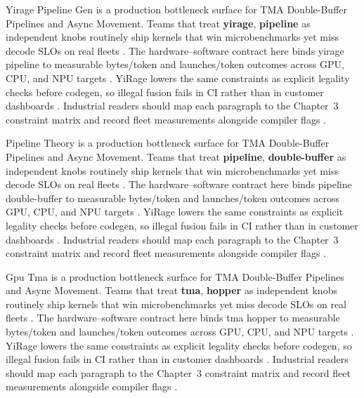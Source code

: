 Yirage Pipeline Gen is a production bottleneck surface for TMA Double-Buffer Pipelines and Async Movement. Teams that treat \textbf{yirage}, \textbf{pipeline} as independent knobs routinely ship kernels that win microbenchmarks yet miss decode SLOs on real fleets \citep{semianalysis2024tma,dlbook}. The hardware--software contract here binds yirage pipeline to measurable bytes/token and launches/token outcomes across GPU, CPU, and NPU targets \citep{amd2024xdna,dao2022flashattention}. YiRage lowers the same constraints as explicit legality checks before codegen, so illegal fusion fails in CI rather than in customer dashboards \citep{amd2024aie,kwon2023vllm}. Industrial readers should map each paragraph to the Chapter~3 constraint matrix and record fleet measurements alongside compiler flags \citep{dlbook,nvidia2024cudagraphs}.

Pipeline Theory is a production bottleneck surface for TMA Double-Buffer Pipelines and Async Movement. Teams that treat \textbf{pipeline}, \textbf{double-buffer} as independent knobs routinely ship kernels that win microbenchmarks yet miss decode SLOs on real fleets \citep{amd2024xdna,dao2022flashattention}. The hardware--software contract here binds pipeline double-buffer to measurable bytes/token and launches/token outcomes across GPU, CPU, and NPU targets \citep{amd2024aie,kwon2023vllm}. YiRage lowers the same constraints as explicit legality checks before codegen, so illegal fusion fails in CI rather than in customer dashboards \citep{dlbook,nvidia2024cudagraphs}. Industrial readers should map each paragraph to the Chapter~3 constraint matrix and record fleet measurements alongside compiler flags \citep{dao2022flashattention,liu2024deepseekv3}.

Gpu Tma is a production bottleneck surface for TMA Double-Buffer Pipelines and Async Movement. Teams that treat \textbf{tma}, \textbf{hopper} as independent knobs routinely ship kernels that win microbenchmarks yet miss decode SLOs on real fleets \citep{amd2024aie,kwon2023vllm}. The hardware--software contract here binds tma hopper to measurable bytes/token and launches/token outcomes across GPU, CPU, and NPU targets \citep{dlbook,nvidia2024cudagraphs}. YiRage lowers the same constraints as explicit legality checks before codegen, so illegal fusion fails in CI rather than in customer dashboards \citep{dao2022flashattention,liu2024deepseekv3}. Industrial readers should map each paragraph to the Chapter~3 constraint matrix and record fleet measurements alongside compiler flags \citep{kwon2023vllm,patel2025llminference}.

